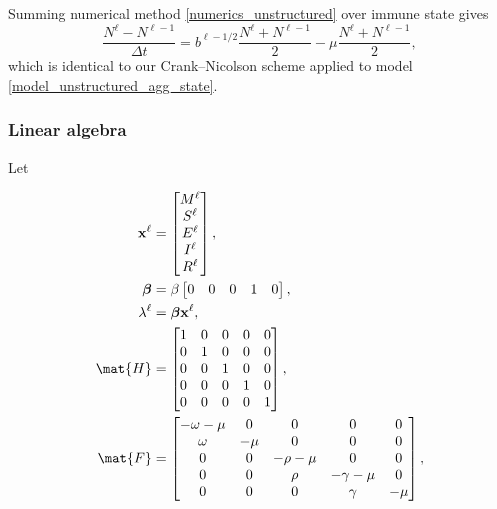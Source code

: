 \documentclass{jpmarticle}
\renewcommand{\vec}[1]{\boldsymbol{\mathrm{#1}}}
\let\subequationsorig\subequations%
\let\endsubequationsorig\endsubequations%
\renewenvironment{subequations}{
  \subequationsorig
  \renewcommand{\theequation}{\theparentequation.\arabic{equation}}
}{
  \endsubequationsorig
}
\begin{document}
Summing numerical method \eqref{numerics_unstructured} over
immune state gives
\begin{equation}
  \label{numerics_unstructured_agg_state}
  \frac{N^{\ell} - N^{\ell - 1}}{\Delta t}
  = b^{\ell - 1 / 2} \frac{N^{\ell} + N^{\ell - 1}}{2}
  - \mu \frac{N^{\ell} + N^{\ell - 1}}{2},
\end{equation}
which is identical to our Crank--Nicolson scheme applied to model
\eqref{model_unstructured_agg_state}.


\subsubsection{Linear algebra}

Let
\begin{subequations}
  \begin{align}
    \vec{x}^{\ell} &=
    \begin{bmatrix}
      M^{\ell} \\ S^{\ell} \\ E^{\ell} \\ I^{\ell} \\ R^{\ell}
    \end{bmatrix},
    \\
    \vec{\beta} &=
    \beta
    \begin{bmatrix}
      0 & 0 & 0 & 1 & 0
    \end{bmatrix},
    \\
    \lambda^{\ell} &=
    \vec{\beta} \vec{x}^{\ell},
    \\
    \mat{H} &=
    \begin{bmatrix}
      1 & 0 & 0 & 0 & 0 \\
      0 & 1 & 0 & 0 & 0 \\
      0 & 0 & 1 & 0 & 0 \\
      0 & 0 & 0 & 1 & 0 \\
      0 & 0 & 0 & 0 & 1
    \end{bmatrix},
    \\
    \mat{F} &=
    \begin{bmatrix}
      - \omega - \mu & 0 & 0 & 0 & 0 \\
      \omega & - \mu & 0 & 0 & 0 \\
      0 & 0 & - \rho - \mu & 0 & 0 \\
      0 & 0 & \rho & - \gamma - \mu & 0 \\
      0 & 0 & 0 & \gamma & - \mu
    \end{bmatrix},
    \\

\end{align}
\end{subequations}
\end{document}
